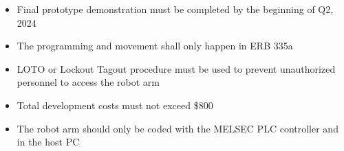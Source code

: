 \begin{itemize}
  \item Final prototype demonstration must be completed by the beginning of Q2, 2024
  \item The programming and movement shall only happen in ERB 335a
  \item LOTO or Lockout Tagout procedure must be used to prevent unauthorized personnel to access the robot arm
  \item Total development costs must not exceed \$800
  \item The robot arm should only be coded with the MELSEC PLC controller and in the host PC
\end{itemize}
